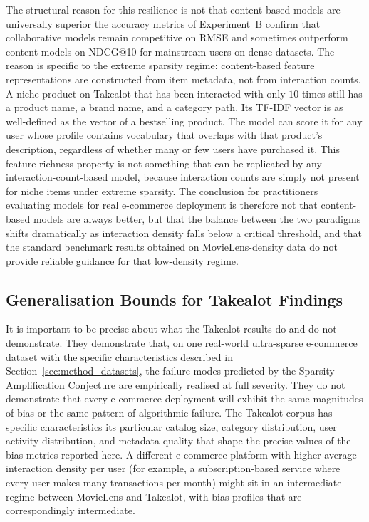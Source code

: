 \documentclass[11pt,a4paper]{report}
\begin{document}
The structural reason for this resilience is not that content-based models are universally superior the accuracy metrics of Experiment~B confirm that collaborative models remain competitive on RMSE and sometimes outperform content models on NDCG@10 for mainstream users on dense datasets. The reason is specific to the extreme sparsity regime: content-based feature representations are constructed from item metadata, not from interaction counts. A niche product on Takealot that has been interacted with only $10$ times still has a product name, a brand name, and a category path. Its TF-IDF vector is as well-defined as the vector of a bestselling product. The model can score it for any user whose profile contains vocabulary that overlaps with that product's description, regardless of whether many or few users have purchased it. This feature-richness property is not something that can be replicated by any interaction-count-based model, because interaction counts are simply not present for niche items under extreme sparsity. The conclusion for practitioners evaluating models for real e-commerce deployment is therefore not that content-based models are always better, but that the balance between the two paradigms shifts dramatically as interaction density falls below a critical threshold, and that the standard benchmark results obtained on MovieLens-density data do not provide reliable guidance for that low-density regime.

\subsection*{Generalisation Bounds for Takealot Findings}

It is important to be precise about what the Takealot results do and do not demonstrate. They demonstrate that, on one real-world ultra-sparse e-commerce dataset with the specific characteristics described in Section~\ref{sec:method_datasets}, the failure modes predicted by the Sparsity Amplification Conjecture are empirically realised at full severity. They do not demonstrate that every e-commerce deployment will exhibit the same magnitudes of bias or the same pattern of algorithmic failure. The Takealot corpus has specific characteristics its particular catalog size, category distribution, user activity distribution, and metadata quality that shape the precise values of the bias metrics reported here. A different e-commerce platform with higher average interaction density per user (for example, a subscription-based service where every user makes many transactions per month) might sit in an intermediate regime between MovieLens and Takealot, with bias profiles that are correspondingly intermediate.
\end{document}
